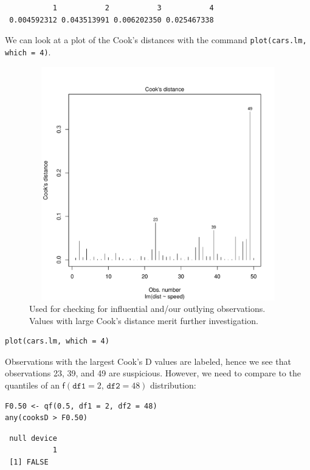 \documentclass[captions=tableheading]{scrbook}
\begin{document}
\begin{verbatim}
           1           2           3           4 
 0.004592312 0.043513991 0.006202350 0.025467338
\end{verbatim}

We can look at a plot of the Cook's distances with the command \texttt{plot(cars.lm, which = 4)}.

\begin{figure}[th]
  \includegraphics[width=5in, height=4in]{img/Cooks-distance-cars.pdf}
  \caption[Cook's distances for the \texttt{cars} data]{\small Used for checking for influential and/our outlying observations. Values with large Cook's distance merit further investigation.}
  \label{fig:Cooks-distance-cars}
\end{figure}


\begin{verbatim}
plot(cars.lm, which = 4)
\end{verbatim}

Observations with the largest Cook's D values are labeled, hence we see that observations 23, 39, and 49 are suspicious. However, we need to compare to the quantiles of an \( \mathsf{f}(\mathtt{df1} = 2, \, \mathtt{df2} = 48) \) distribution:


\begin{verbatim}
F0.50 <- qf(0.5, df1 = 2, df2 = 48)
any(cooksD > F0.50)
\end{verbatim}

\begin{verbatim}
 null device 
           1
 [1] FALSE
\end{verbatim}
\end{document}
